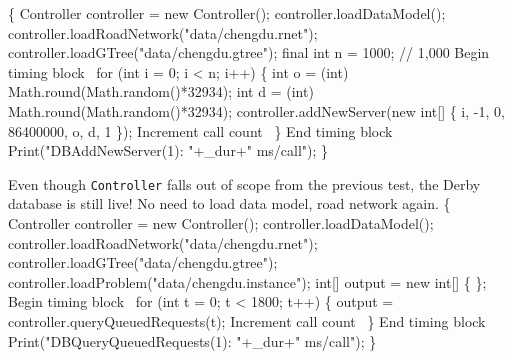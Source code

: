 \documentclass{article}
\def\nwendcode{\endtrivlist \endgroup}
\let\nwdocspar=\par
\begin{document}
\nwenddocs{}\endmoddef{}
\{
  Controller controller = new Controller();
  controller.loadDataModel();
  controller.loadRoadNetwork("data/chengdu.rnet");
  controller.loadGTree("data/chengdu.gtree");
  final int n = 1000;  // 1,000
  \LA{}Begin timing block~{\nwtagstyle{}}\RA{}
  for (int i = 0; i < n; i++) \{
    int o = (int) Math.round(Math.random()*32934);
    int d = (int) Math.round(Math.random()*32934);
    controller.addNewServer(new int[] \{ i, -1, 0, 86400000, o, d, 1 \});
    \LA{}Increment call count~{\nwtagstyle{}}\RA{}
  \}
  \LA{}End timing block~{\nwtagstyle{}}\RA{}
  Print("DBAddNewServer(1): "+_dur+" ms/call");
\}
\nwendcode{}\nwdocspar

Even though {\tt{}Controller} falls out of scope from the previous test,
the Derby database is still live! No need to load data model, road network
again.
\nwenddocs{}\endmoddef{}
\{
  Controller controller = new Controller();
  controller.loadDataModel();
  controller.loadRoadNetwork("data/chengdu.rnet");
  controller.loadGTree("data/chengdu.gtree");
  controller.loadProblem("data/chengdu.instance");
  int[] output = new int[] \{ \};
  \LA{}Begin timing block~{\nwtagstyle{}}\RA{}
  for (int t = 0; t < 1800; t++) \{
    output = controller.queryQueuedRequests(t);
    \LA{}Increment call count~{\nwtagstyle{}}\RA{}
  \}
  \LA{}End timing block~{\nwtagstyle{}}\RA{}
  Print("DBQueryQueuedRequests(1): "+_dur+" ms/call");
\}
\nwendcode{}\nwdocspar
\end{document}
